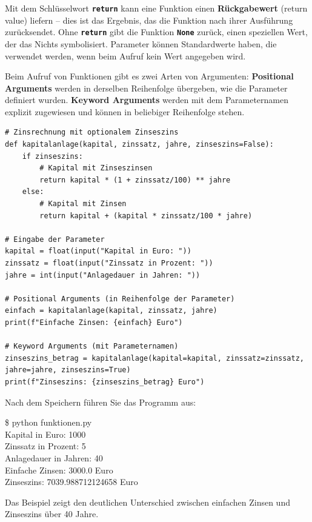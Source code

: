 \documentclass[ngerman,11pt]{article}
\begin{document}
Mit dem Schlüsselwort \textbf{\texttt{return}} kann eine Funktion einen \textbf{Rückgabewert} (return value) liefern -- dies ist das Ergebnis, das die Funktion nach ihrer Ausführung zurücksendet. Ohne \textbf{\texttt{return}} gibt die Funktion \textbf{\texttt{None}} zurück, einen speziellen Wert, der das Nichts symbolisiert. Parameter können Standardwerte haben, die verwendet werden, wenn beim Aufruf kein Wert angegeben wird.

Beim Aufruf von Funktionen gibt es zwei Arten von Argumenten: \textbf{Positional Arguments} werden in derselben Reihenfolge übergeben, wie die Parameter definiert wurden. \textbf{Keyword Arguments} werden mit dem Parameternamen explizit zugewiesen und können in beliebiger Reihenfolge stehen.
\begin{lstlisting}[caption=funktionen.py]
# Zinsrechnung mit optionalem Zinseszins
def kapitalanlage(kapital, zinssatz, jahre, zinseszins=False):
    if zinseszins:
        # Kapital mit Zinseszinsen
        return kapital * (1 + zinssatz/100) ** jahre
    else:
        # Kapital mit Zinsen
        return kapital + (kapital * zinssatz/100 * jahre)

# Eingabe der Parameter
kapital = float(input("Kapital in Euro: "))
zinssatz = float(input("Zinssatz in Prozent: "))
jahre = int(input("Anlagedauer in Jahren: "))

# Positional Arguments (in Reihenfolge der Parameter)
einfach = kapitalanlage(kapital, zinssatz, jahre)
print(f"Einfache Zinsen: {einfach} Euro")

# Keyword Arguments (mit Parameternamen)
zinseszins_betrag = kapitalanlage(kapital=kapital, zinssatz=zinssatz, jahre=jahre, zinseszins=True)
print(f"Zinseszins: {zinseszins_betrag} Euro")
\end{lstlisting}

\noindent Nach dem Speichern führen Sie das Programm aus:

\begin{tcolorbox}[colback=gray!15, fontupper=\ttfamily, boxrule=0.5pt,
    left=3mm, right=3mm, top=2mm, bottom=2mm]
\$ python funktionen.py\\
Kapital in Euro: 1000\\
Zinssatz in Prozent: 5\\
Anlagedauer in Jahren: 40\\
Einfache Zinsen: 3000.0 Euro\\
Zinseszins: 7039.988712124658 Euro
\end{tcolorbox}

\noindent Das Beispiel zeigt den deutlichen Unterschied zwischen einfachen Zinsen und Zinseszins über 40 Jahre.
\end{document}
